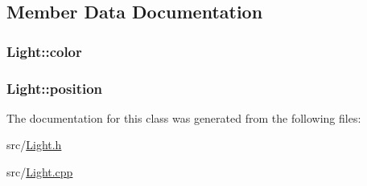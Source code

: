 \subsection{Member Data Documentation}
\hypertarget{class_light_ae9514e53f145e55f4577669fb90eb643}{
\subsubsection[{color}]{ Light\-::color}}\label{class_light_ae9514e53f145e55f4577669fb90eb643}
\hypertarget{class_light_ad047885927f38a87ac7e9d196fe9f617}{
\subsubsection[{position}]{ Light\-::position}}\label{class_light_ad047885927f38a87ac7e9d196fe9f617}


The documentation for this class was generated from the following files\-:\begin{DoxyCompactItemize}
\item 
src/\hyperlink{src_2light_8h}{Light.\-h}\item 
src/\hyperlink{_light_8cpp}{Light.\-cpp}\end{DoxyCompactItemize}
